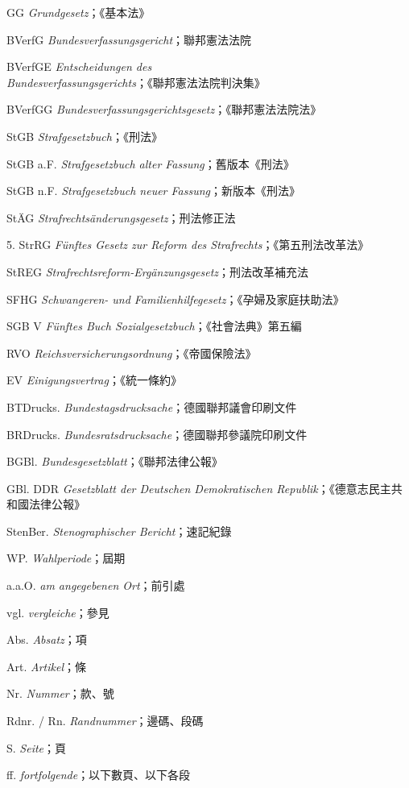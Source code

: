 \documentclass[12pt]{article}
\begin{document}
\begin{termbox}
\begin{termcolumns}
\begin{abbritems}
\item[GG] \textit{Grundgesetz}；《基本法》
\item[BVerfG] \textit{Bundesverfassungsgericht}；聯邦憲法法院
\item[BVerfGE] \textit{Entscheidungen des Bundesverfassungsgerichts}；《聯邦憲法法院判決集》
\item[BVerfGG] \textit{Bundesverfassungsgerichtsgesetz}；《聯邦憲法法院法》
\item[StGB] \textit{Strafgesetzbuch}；《刑法》
\item[StGB a.F.] \textit{Strafgesetzbuch alter Fassung}；舊版本《刑法》
\item[StGB n.F.] \textit{Strafgesetzbuch neuer Fassung}；新版本《刑法》
\item[StÄG] \textit{Strafrechtsänderungsgesetz}；刑法修正法
\item[5. StrRG] \textit{Fünftes Gesetz zur Reform des Strafrechts}；《第五刑法改革法》
\item[StREG] \textit{Strafrechtsreform-Ergänzungsgesetz}；刑法改革補充法
\item[SFHG] \textit{Schwangeren- und Familienhilfegesetz}；《孕婦及家庭扶助法》
\item[SGB V] \textit{Fünftes Buch Sozialgesetzbuch}；《社會法典》第五編
\item[RVO] \textit{Reichsversicherungsordnung}；《帝國保險法》
\item[EV] \textit{Einigungsvertrag}；《統一條約》
\item[BTDrucks.] \textit{Bundestagsdrucksache}；德國聯邦議會印刷文件
\item[BRDrucks.] \textit{Bundesratsdrucksache}；德國聯邦參議院印刷文件
\item[BGBl.] \textit{Bundesgesetzblatt}；《聯邦法律公報》
\item[GBl. DDR] \textit{Gesetzblatt der Deutschen Demokratischen Republik}；《德意志民主共和國法律公報》
\item[StenBer.] \textit{Stenographischer Bericht}；速記紀錄
\item[WP.] \textit{Wahlperiode}；屆期
\item[a.a.O.] \textit{am angegebenen Ort}；前引處
\item[vgl.] \textit{vergleiche}；參見
\item[Abs.] \textit{Absatz}；項
\item[Art.] \textit{Artikel}；條
\item[Nr.] \textit{Nummer}；款、號
\item[Rdnr. / Rn.] \textit{Randnummer}；邊碼、段碼
\item[S.] \textit{Seite}；頁
\item[ff.] \textit{fortfolgende}；以下數頁、以下各段
\end{abbritems}
\end{termcolumns}
\end{termbox}
\end{document}
